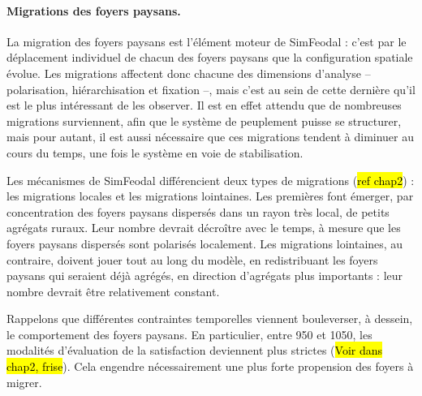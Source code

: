 \paragraph{Migrations des foyers paysans.}

La migration des foyers paysans est l'élément moteur de SimFeodal :
c'est par le déplacement individuel de chacun des foyers paysans que la configuration spatiale évolue.
Les migrations affectent donc chacune des dimensions d'analyse -- polarisation, hiérarchisation et fixation --, mais c'est au sein de cette dernière qu'il est le plus intéressant de les observer.
Il est en effet attendu que de nombreuses migrations surviennent, afin que le système de peuplement puisse se structurer, mais pour autant, il est aussi nécessaire que ces migrations tendent à diminuer au cours du temps, une fois le système en voie de stabilisation.

Les mécanismes de SimFeodal différencient deux types de migrations (\hl{ref chap2}) : les migrations locales et les migrations lointaines.
Les premières font émerger, par concentration des foyers paysans dispersés dans un rayon très local, de petits agrégats ruraux.
Leur nombre devrait décroître avec le temps, à mesure que les foyers paysans dispersés sont polarisés localement.
Les migrations lointaines, au contraire, doivent jouer tout au long du modèle, en redistribuant les foyers paysans qui seraient déjà agrégés, en direction d'agrégats plus importants : leur nombre devrait être relativement constant.

Rappelons que différentes contraintes temporelles viennent bouleverser, à dessein, le comportement des foyers paysans.
En particulier, entre 950 et 1050, les modalités d'évaluation de la satisfaction deviennent plus strictes (\hl{Voir dans chap2, frise}).
Cela engendre nécessairement une plus forte propension des foyers à migrer.

